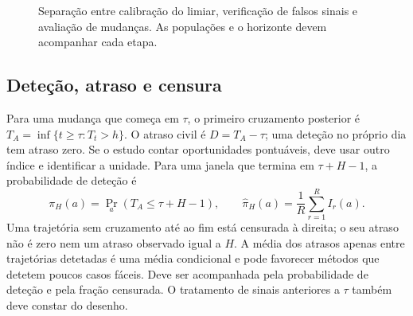 \begin{figure}[htbp]
\centering
{}
\caption{Separação entre calibração do limiar, verificação de falsos sinais e avaliação de mudanças. As populações e o horizonte devem acompanhar cada etapa.}
\label{fig:mat-calibracao-simulacao}
\end{figure}

\subsection{Deteção, atraso e censura}
\label{sec:mat-deteccao}
 Para uma
mudança que começa em $\tau$, o primeiro cruzamento posterior é $T_A=\inf\{t\geq\tau:T_t>h\}$. O atraso civil é $D=T_A-\tau$; uma deteção no próprio dia tem atraso zero. Se o estudo contar oportunidades pontuáveis, deve usar outro índice e identificar a unidade. Para uma janela que termina em $\tau+H-1$, a probabilidade de deteção é
\begin{equation}
\pi_H(a)=\Pr_a(T_A\leq\tau+H-1),
\qquad \widehat\pi_H(a)=\frac1R\sum_{r=1}^{R}I_r(a).
\label{eq:mat-deteccao}
\end{equation}
Uma trajetória sem cruzamento até ao fim está censurada à direita; o seu atraso não é zero nem um atraso observado igual a $H$. A média dos atrasos apenas entre trajetórias detetadas é uma média condicional e pode favorecer métodos que detetem poucos casos fáceis. Deve ser acompanhada pela probabilidade de deteção e pela fração censurada. O tratamento de sinais anteriores a $\tau$ também deve constar do desenho.

